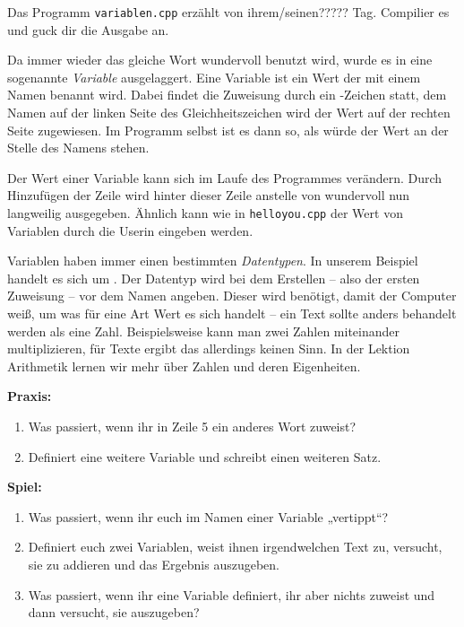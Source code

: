 
Das Programm \texttt{variablen.cpp} erzählt von ihrem/seinen????? Tag.
Compilier es und guck dir die Ausgabe an.


Da immer wieder das gleiche Wort \glqq{}wundervoll\grqq{} benutzt wird, wurde es in eine sogenannte \emph{Variable} ausgelaggert.
Eine Variable ist ein Wert der mit einem Namen benannt wird.
Dabei findet die Zuweisung durch ein \cppinline{=}-Zeichen statt, dem Namen auf der linken Seite des Gleichheitszeichen wird der Wert auf der rechten Seite zugewiesen.
Im Programm selbst ist es dann so, als würde der Wert an der Stelle des Namens stehen.

Der Wert einer Variable kann sich im Laufe des Programmes verändern.
Durch Hinzufügen der Zeile  wird hinter dieser Zeile anstelle von \glqq{}wundervoll\grqq{} nun \glqq{}langweilig\grqq{} ausgegeben.
Ähnlich kann wie in \texttt{helloyou.cpp} der Wert von Variablen durch  die Userin eingeben werden.

Variablen haben immer einen bestimmten \emph{Datentypen}.
In unserem Beispiel handelt es sich um .
Der Datentyp wird bei dem Erstellen -- also der ersten Zuweisung -- vor dem Namen angeben.
Dieser wird benötigt, damit der Computer weiß, um was für eine Art Wert es sich handelt -- ein Text sollte anders behandelt werden als eine Zahl.
Beispielsweise kann man zwei Zahlen miteinander multiplizieren, für Texte ergibt das allerdings keinen Sinn.
In der Lektion Arithmetik lernen wir mehr über Zahlen und deren Eigenheiten.

\textbf{Praxis:}
\begin{enumerate}
    \item Was passiert, wenn ihr  in Zeile 5 ein anderes Wort zuweist?
    \item Definiert eine weitere Variable und schreibt einen weiteren Satz.
\end{enumerate}

\textbf{Spiel:}
\begin{enumerate}
    \item Was passiert, wenn ihr euch im Namen einer Variable „vertippt“?
    \item Definiert euch zwei  Variablen, weist ihnen
        irgendwelchen Text zu, versucht, sie zu addieren und das Ergebnis auszugeben.
    \item Was passiert, wenn ihr eine  Variable definiert,
        ihr aber nichts zuweist und dann versucht, sie auszugeben?
\end{enumerate}
